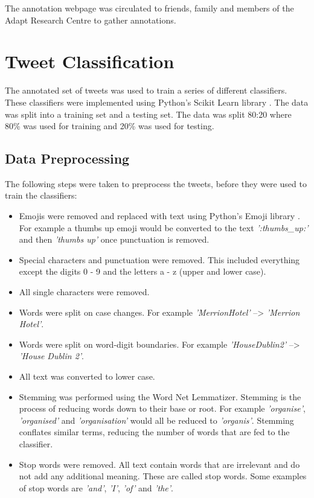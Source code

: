 The annotation webpage was circulated to friends, family and members of the Adapt Research Centre to gather annotations.

\section{Tweet Classification}

The annotated set of tweets was used to train a series of different classifiers. These classifiers were implemented using Python's Scikit Learn library \cite{scikit-learn}. The data was split into a training set and a testing set. The data was split 80:20 where 80\% was used for training and 20\% was used for testing.

\subsection*{Data Preprocessing}

The following steps were taken to preprocess the tweets, before they were used to train the classifiers:
\begin{itemize}
    \item Emojis were removed and replaced with text using Python's Emoji library \cite{emoji}. For example a thumbs up emoji would be converted to the text \emph{':thumbs\_up:'} and then \emph{'thumbs up'} once punctuation is removed.
    \item Special characters and punctuation were removed. This included everything except the digits 0 - 9 and the letters a - z (upper and lower case).
    \item All single characters were removed.
    \item Words were split on case changes. For example \emph{'MerrionHotel'} --> \emph{'Merrion Hotel'}.
    \item Words were split on word-digit boundaries. For example \emph{'HouseDublin2'} --> \emph{'House Dublin 2'}.
    \item All text was converted to lower case.
    \item Stemming was performed using the Word Net Lemmatizer. Stemming is the process of reducing words down to their base or root. For example \emph{'organise'}, \emph{'organised'} and \emph{'organisation'} would all be reduced to \emph{'organis'}. Stemming conflates similar terms, reducing the number of words that are fed to the classifier.
    \item Stop words were removed. All text contain words that are irrelevant and do not add any additional meaning. These are called stop words. Some examples of stop words are \emph{'and'}, \emph{'I'}, \emph{'of'} and \emph{'the'}.
\end{itemize}

